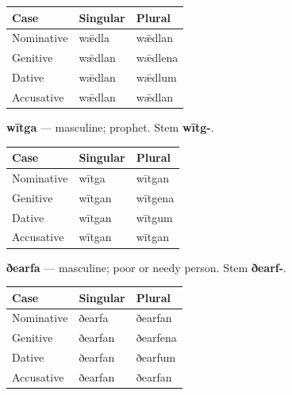 \par\begingroup
\fontsize{10.5}{13.2}\selectfont
\setlength{\LTleft}{0pt}\setlength{\LTright}{\fill}
\noindent
\begin{tabular}{@{}>{\raggedright\arraybackslash}p{39.46mm}>{\raggedright\arraybackslash}p{39.46mm}>{\raggedright\arraybackslash}p{39.46mm}@{}}
\toprule
\textbf{Case} & \textbf{Singular} & \textbf{Plural} \\
\midrule
Nominative & wǣdla & wǣdlan \\
Genitive & wǣdlan & wǣdlena \\
Dative & wǣdlan & wǣdlum \\
Accusative & wǣdlan & wǣdlan \\
\bottomrule
\end{tabular}
\par\endgroup

\textbf{wītga} — masculine; prophet. Stem \textbf{wītg-}.

\par\begingroup
\fontsize{10.5}{13.2}\selectfont
\setlength{\LTleft}{0pt}\setlength{\LTright}{\fill}
\noindent
\begin{tabular}{@{}>{\raggedright\arraybackslash}p{39.46mm}>{\raggedright\arraybackslash}p{39.46mm}>{\raggedright\arraybackslash}p{39.46mm}@{}}
\toprule
\textbf{Case} & \textbf{Singular} & \textbf{Plural} \\
\midrule
Nominative & wītga & wītgan \\
Genitive & wītgan & wītgena \\
Dative & wītgan & wītgum \\
Accusative & wītgan & wītgan \\
\bottomrule
\end{tabular}
\par\endgroup

\textbf{ðearfa} — masculine; poor or needy person. Stem \textbf{ðearf-}.

\par\begingroup
\fontsize{10.5}{13.2}\selectfont
\setlength{\LTleft}{0pt}\setlength{\LTright}{\fill}
\noindent
\begin{tabular}{@{}>{\raggedright\arraybackslash}p{39.46mm}>{\raggedright\arraybackslash}p{39.46mm}>{\raggedright\arraybackslash}p{39.46mm}@{}}
\toprule
\textbf{Case} & \textbf{Singular} & \textbf{Plural} \\
\midrule
Nominative & ðearfa & ðearfan \\
Genitive & ðearfan & ðearfena \\
Dative & ðearfan & ðearfum \\
Accusative & ðearfan & ðearfan \\
\bottomrule
\end{tabular}
\par\endgroup

